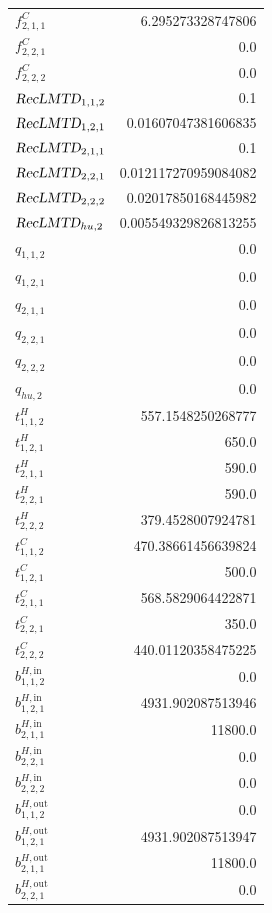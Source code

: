\documentclass{article}%
\begin{document}
\begin{multicols*}{3}
\begin{supertabular}{lr}
	$f_{2,1,1}^{C}$ & 6.295273328747806 \\%
	$f_{2,2,1}^{C}$ & 0.0 \\%
	$f_{2,2,2}^{C}$ & 0.0 \\%
	$\textsl{RecLMTD}_{1,1,2}$ & 0.1 \\%
	$\textsl{RecLMTD}_{1,2,1}$ & 0.01607047381606835 \\%
	$\textsl{RecLMTD}_{2,1,1}$ & 0.1 \\%
	$\textsl{RecLMTD}_{2,2,1}$ & 0.012117270959084082 \\%
	$\textsl{RecLMTD}_{2,2,2}$ & 0.02017850168445982 \\%
	$\textsl{RecLMTD}_{hu,2}$ & 0.005549329826813255 \\%
	$q_{1,1,2}$ & 0.0 \\%
	$q_{1,2,1}$ & 0.0 \\%
	$q_{2,1,1}$ & 0.0 \\%
	$q_{2,2,1}$ & 0.0 \\%
	$q_{2,2,2}$ & 0.0 \\%
	$q_{hu,2}$ & 0.0 \\%
	$t_{1,1,2}^{H}$ & 557.1548250268777 \\%
	$t_{1,2,1}^{H}$ & 650.0 \\%
	$t_{2,1,1}^{H}$ & 590.0 \\%
	$t_{2,2,1}^{H}$ & 590.0 \\%
	$t_{2,2,2}^{H}$ & 379.4528007924781 \\%
	$t_{1,1,2}^{C}$ & 470.38661456639824 \\%
	$t_{1,2,1}^{C}$ & 500.0 \\%
	$t_{2,1,1}^{C}$ & 568.5829064422871 \\%
	$t_{2,2,1}^{C}$ & 350.0 \\%
	$t_{2,2,2}^{C}$ & 440.01120358475225 \\%
	$b_{1,1,2}^{H,\text{in}}$ & 0.0 \\%
	$b_{1,2,1}^{H,\text{in}}$ & 4931.902087513946 \\%
	$b_{2,1,1}^{H,\text{in}}$ & 11800.0 \\%
	$b_{2,2,1}^{H,\text{in}}$ & 0.0 \\%
	$b_{2,2,2}^{H,\text{in}}$ & 0.0 \\%
	$b_{1,1,2}^{H,\text{out}}$ & 0.0 \\%
	$b_{1,2,1}^{H,\text{out}}$ & 4931.902087513947 \\%
	$b_{2,1,1}^{H,\text{out}}$ & 11800.0 \\%
	$b_{2,2,1}^{H,\text{out}}$ & 0.0 \\%

\end{supertabular}
\end{multicols*}
\end{document}
